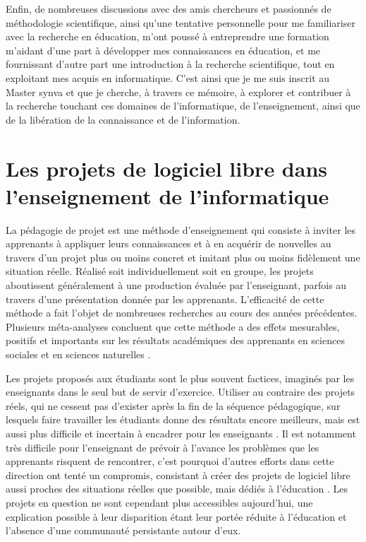 Enfin, de nombreuses discussions avec des amis chercheurs et passionnés de méthodologie scientifique, ainsi
qu'une tentative personnelle pour me familiariser avec la recherche en éducation, m'ont poussé à entreprendre
une formation m'aidant d'une part à développer mes connaissances en éducation, et me fournissant d'autre part
une introduction à la recherche scientifique, tout en exploitant mes acquis en informatique. C'est ainsi que
je me suis inscrit au Master \gls{synva} et que je cherche, à travers ce mémoire, à explorer et contribuer à
la recherche touchant ces domaines de l'informatique, de l'enseignement, ainsi que de la libération de la
connaissance et de l'information.

\section{Les projets de logiciel libre dans l'enseignement de l'informatique}

La pédagogie de projet est une méthode d'enseignement qui consiste à inviter les apprenants à appliquer leurs
connaissances et à en acquérir de nouvelles au travers d'un projet plus ou moins concret et imitant plus ou
moins fidèlement une situation réelle. Réalisé soit individuellement soit en groupe, les projets aboutissent
généralement à une production évaluée par l'enseignant, parfois au travers d'une présentation donnée par les
apprenants. L'efficacité de cette méthode a fait l'objet de nombreuses recherches au cours des années
précédentes. Plusieurs méta-analyses concluent que cette méthode a des effets mesurables, positifs et
importants sur les résultats académiques des apprenants en sciences sociales et en sciences naturelles
.

Les projets proposés aux étudiants sont le plus souvent factices, imaginés par les enseignants dans le seul
but de servir d'exercice. Utiliser au contraire des projets réels, qui ne cessent pas d'exister après la fin
de la séquence pédagogique, sur lesquels faire travailler les étudiants donne des résultats encore meilleurs,
mais est aussi plus difficile et incertain à encadrer pour les enseignants . Il est notamment très difficile pour l'enseignant de prévoir à l'avance les problèmes que les
apprenants risquent de rencontrer, c'est pourquoi d'autres efforts dans cette direction ont tenté un
compromis, consistant à créer des projets de logiciel libre aussi proches des situations réelles que possible,
mais dédiés à l'éducation . Les projets en question ne sont cependant plus
accessibles aujourd'hui, une explication possible à leur disparition étant leur portée réduite à l'éducation
et l'absence d'une communauté persistante autour d'eux.

